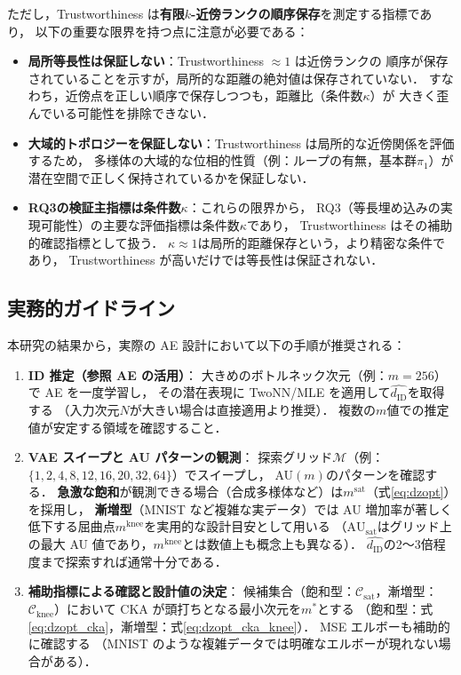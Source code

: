 \documentclass[12pt,a4paper]{jsarticle}
\newcommand{\dID}{d_{\mathrm{ID}}}
\newcommand{\dzopt}{m^*}                    %
\newcommand{\kap}{\kappa}
\newcommand{\AUsat}{\mathrm{AU}_{\mathrm{sat}}}
\newcommand{\dzsat}{m^{\mathrm{sat}}}       %
\newcommand{\mknee}{m^{\mathrm{knee}}}      %
\begin{document}
ただし，Trustworthiness は\textbf{有限$k$-近傍ランクの順序保存}を測定する指標であり，
以下の重要な限界を持つ点に注意が必要である：
\begin{itemize}
  \item \textbf{局所等長性は保証しない}：Trustworthiness $\approx 1$ は近傍ランクの
        順序が保存されていることを示すが，局所的な距離の絶対値は保存されていない．
        すなわち，近傍点を正しい順序で保存しつつも，距離比（条件数$\kap$）が
        大きく歪んでいる可能性を排除できない．
  \item \textbf{大域的トポロジーを保証しない}：Trustworthiness は局所的な近傍関係を評価するため，
        多様体の大域的な位相的性質（例：ループの有無，基本群$\pi_1$）が
        潜在空間で正しく保持されているかを保証しない．
  \item \textbf{RQ3の検証主指標は条件数$\kap$}：これらの限界から，
        RQ3（等長埋め込みの実現可能性）の主要な評価指標は条件数$\kap$であり，
        Trustworthiness はその補助的確認指標として扱う．
        $\kap \approx 1$は局所的距離保存という，より精密な条件であり，
        Trustworthiness が高いだけでは等長性は保証されない．
\end{itemize}

\subsection{実務的ガイドライン}\label{sec:disc_guideline}

本研究の結果から，実際の AE 設計において以下の手順が推奨される：

\begin{enumerate}
  \item \textbf{ID 推定（参照 AE の活用）}：
        大きめのボトルネック次元（例：$m = 256$）で AE を一度学習し，
        その潜在表現に TwoNN/MLE を適用して$\hat{\dID}$を取得する
        （入力次元$N$が大きい場合は直接適用より推奨）．
        複数の$m$値での推定値が安定する領域を確認すること．
  \item \textbf{VAE スイープと AU パターンの観測}：
        探索グリッド$\mathcal{M}$（例：$\{1,2,4,8,12,16,20,32,64\}$）でスイープし，
        AU$(m)$のパターンを確認する．
        \textbf{急激な飽和}が観測できる場合（合成多様体など）は$\dzsat$（式\eqref{eq:dzopt}）を採用し，
        \textbf{漸増型}（MNIST など複雑な実データ）では
        AU 増加率が著しく低下する屈曲点$\mknee$を実用的な設計目安として用いる
        （$\AUsat$はグリッド上の最大 AU 値であり，$\mknee$とは数値上も概念上も異なる）．
        $\hat{\dID}$の2〜3倍程度まで探索すれば通常十分である．
  \item \textbf{補助指標による確認と設計値の決定}：
        候補集合（飽和型：$\mathcal{C}_{\mathrm{sat}}$，漸増型：$\mathcal{C}_{\mathrm{knee}}$）において
        CKA が頭打ちとなる最小次元を$\dzopt$とする
        （飽和型：式\eqref{eq:dzopt_cka}，漸増型：式\eqref{eq:dzopt_cka_knee}）．
        MSE エルボーも補助的に確認する
        （MNIST のような複雑データでは明確なエルボーが現れない場合がある）．
\end{enumerate}
\end{document}
